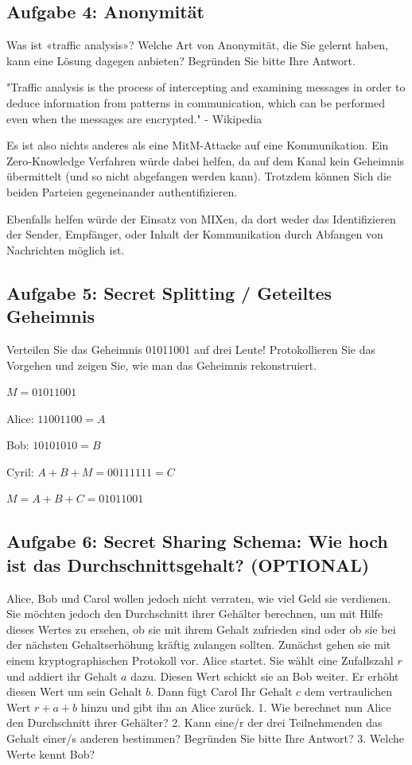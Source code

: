 \documentclass[11pt]{article}
\begin{document}
    \subsection{Aufgabe 4: Anonymität}\label{aufgabe-4-anonymituxe4t}

    Was ist «traffic analysis»? Welche Art von Anonymität, die Sie gelernt
haben, kann eine Lösung dagegen anbieten? Begründen Sie bitte Ihre
Antwort.

    "Traffic analysis is the process of intercepting and examining messages
in order to deduce information from patterns in communication, which can
be performed even when the messages are encrypted." - Wikipedia

Es ist also nichts anderes als eine MitM-Attacke auf eine Kommunikation.
Ein Zero-Knowledge Verfahren würde dabei helfen, da auf dem Kanal kein
Geheimnis übermittelt (und so nicht abgefangen werden kann). Trotzdem
können Sich die beiden Parteien gegeneinander authentifizieren.

Ebenfalls helfen würde der Einsatz von MIXen, da dort weder das
Identifizieren der Sender, Empfänger, oder Inhalt der Kommunikation
durch Abfangen von Nachrichten möglich ist.

    \subsection{Aufgabe 5: Secret Splitting / Geteiltes
Geheimnis}\label{aufgabe-5-secret-splitting-geteiltes-geheimnis}

    Verteilen Sie das Geheimnis 01011001 auf drei Leute! Protokollieren Sie
das Vorgehen und zeigen Sie, wie man das Geheimnis rekonstruiert.

    \(M = 01011001\)

Alice: \(11001100 = A\)

Bob: \(10101010 = B\)

Cyril: \(A + B + M = 00111111 = C\)

\(M = A + B + C = 01011001\)

    \subsection{Aufgabe 6: Secret Sharing Schema: Wie hoch ist das
Durchschnittsgehalt?
(OPTIONAL)}\label{aufgabe-6-secret-sharing-schema-wie-hoch-ist-das-durchschnittsgehalt-optional}

    Alice, Bob und Carol wollen jedoch nicht verraten, wie viel Geld sie
verdienen. Sie möchten jedoch den Durchschnitt ihrer Gehälter berechnen,
um mit Hilfe dieses Wertes zu ersehen, ob sie mit ihrem Gehalt zufrieden
sind oder ob sie bei der nächsten Gehaltserhöhung kräftig zulangen
sollten. Zunächst gehen sie mit einem kryptographischen Protokoll vor.
Alice startet. Sie wählt eine Zufallszahl \(r\) und addiert ihr Gehalt
\(a\) dazu. Diesen Wert schickt sie an Bob weiter. Er erhöht diesen Wert
um sein Gehalt \(b\). Dann fügt Carol Ihr Gehalt \(c\) dem vertraulichen
Wert \(r + a + b\) hinzu und gibt ihn an Alice zurück. 1. Wie berechnet
nun Alice den Durchschnitt ihrer Gehälter? 2. Kann eine/r der drei
Teilnehmenden das Gehalt einer/s anderen bestimmen? Begründen Sie bitte
Ihre Antwort? 3. Welche Werte kennt Bob?
\end{document}
